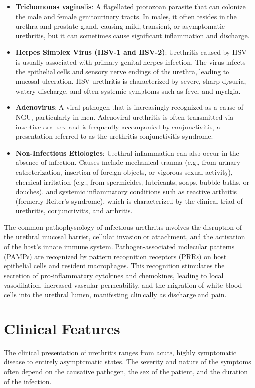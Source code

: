 \begin{itemize}
    \item \textbf{Trichomonas vaginalis}: A flagellated protozoan parasite that can colonize the male and female genitourinary tracts. In males, it often resides in the urethra and prostate gland, causing mild, transient, or asymptomatic urethritis, but it can sometimes cause significant inflammation and discharge.

    \item \textbf{Herpes Simplex Virus (HSV-1 and HSV-2)}: Urethritis caused by HSV is usually associated with primary genital herpes infection. The virus infects the epithelial cells and sensory nerve endings of the urethra, leading to mucosal ulceration. HSV urethritis is characterized by severe, sharp dysuria, watery discharge, and often systemic symptoms such as fever and myalgia.

    \item \textbf{Adenovirus}: A viral pathogen that is increasingly recognized as a cause of NGU, particularly in men. Adenoviral urethritis is often transmitted via insertive oral sex and is frequently accompanied by conjunctivitis, a presentation referred to as the urethritis-conjunctivitis syndrome.

    \item \textbf{Non-Infectious Etiologies}: Urethral inflammation can also occur in the absence of infection. Causes include mechanical trauma (e.g., from urinary catheterization, insertion of foreign objects, or vigorous sexual activity), chemical irritation (e.g., from spermicides, lubricants, soaps, bubble baths, or douches), and systemic inflammatory conditions such as reactive arthritis (formerly Reiter's syndrome), which is characterized by the clinical triad of urethritis, conjunctivitis, and arthritis.
\end{itemize}

The common pathophysiology of infectious urethritis involves the disruption of the urethral mucosal barrier, cellular invasion or attachment, and the activation of the host's innate immune system. Pathogen-associated molecular patterns (PAMPs) are recognized by pattern recognition receptors (PRRs) on host epithelial cells and resident macrophages. This recognition stimulates the secretion of pro-inflammatory cytokines and chemokines, leading to local vasodilation, increased vascular permeability, and the migration of white blood cells into the urethral lumen, manifesting clinically as discharge and pain.

\section*{Clinical Features}
The clinical presentation of urethritis ranges from acute, highly symptomatic disease to entirely asymptomatic states. The severity and nature of the symptoms often depend on the causative pathogen, the sex of the patient, and the duration of the infection.

